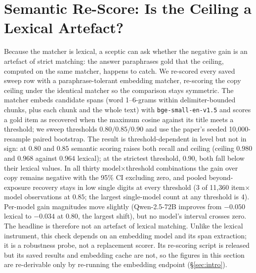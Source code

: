 \documentclass[10pt,twocolumn]{article}
\begin{document}
\section{Semantic Re-Score: Is the Ceiling a Lexical Artefact?}\label{sec:rescore}
Because the matcher is lexical, a sceptic can ask whether the negative gain is an artefact of strict matching: the answer paraphrases gold that the ceiling, computed on the same matcher, happens to catch. We re-scored every saved sweep row with a paraphrase-tolerant embedding matcher, re-scoring the copy ceiling under the identical matcher so the comparison stays symmetric. The matcher embeds candidate spans (word 1--6-grams within delimiter-bounded chunks, plus each chunk and the whole text) with \texttt{bge-small-en-v1.5} and scores a gold item as recovered when the maximum cosine against its title meets a threshold; we sweep thresholds $0.80/0.85/0.90$ and use the paper's seeded 10{,}000-resample paired bootstrap. The result is threshold-dependent in level but not in sign: at $0.80$ and $0.85$ semantic scoring raises both recall and ceiling (ceiling $0.980$ and $0.968$ against $0.964$ lexical); at the strictest threshold, $0.90$, both fall below their lexical values. In all thirty model$\times$threshold combinations the gain over copy remains negative with the 95\% CI excluding zero, and pooled beyond-exposure recovery stays in low single digits at every threshold (3 of 11{,}360 item$\times$model observations at $0.85$; the largest single-model count at any threshold is 4). Per-model gain magnitudes move slightly (Qwen-2.5-72B improves from $-0.050$ lexical to $-0.034$ at $0.80$, the largest shift), but no model's interval crosses zero. The headline is therefore not an artefact of lexical matching. Unlike the lexical instrument, this check depends on an embedding model and its span extraction; it is a robustness probe, not a replacement scorer. Its re-scoring script is released but its saved results and embedding cache are not, so the figures in this section are re-derivable only by re-running the embedding endpoint (\S\ref{sec:intro}).
\end{document}
